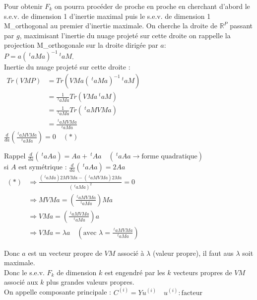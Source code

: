 \documentclass[a4paper, 12pt]{article}
\begin{document}
Pour obtenir $F_k$ on pourra procéder de proche en proche en cherchant d'abord le s.e.v. de dimension 1 d'inertie maximal puis le s.e.v. de dimension 1 M\_{}orthogonal au premier d'inertie maximale. On cherche la droite de $\mathbb{R}^P$ passant par $g$, maximisant l'inertie du nuage projeté sur cette droite on rappelle la projection M\_{}orthogonale sur la droite dirigée par $a$: \\
$P = a (\ ^t a Ma)^{-1} \ ^t a M$. \\

Inertie du nuage projeté sur cette droite : \\
$
\begin{aligned}
Tr(VMP) &= Tr(VM a (\ ^t a Ma)^{-1} \ ^t a M) \\
&= \frac{1}{\ ^t a Ma} Tr(VMa \ ^t aM) \\
&= \frac{1}{\ ^t a Ma} Tr(\ ^t a MVMa) \\
&= \frac{\ ^t a MVMa}{\ ^t a Ma}
\end{aligned}
$ \\

$\frac{d}{da} (\frac{\ ^t a MVMa}{\ ^t a Ma}) = 0 \quad (*)$ \\

\begin{rappel}{Rappel}
$\frac{d}{da} (\ ^t a Aa) = Aa + \ ^t A a \quad (\ ^t a Aa \rightarrow \text{forme quadratique})$ \\
si $A$ est symétrique : $\boxed{\frac{d}{da} (\ ^t a Aa) = 2 Aa}$ \\
$
\begin{aligned}
(*) &\Rightarrow \frac{(\ ^t a Ma) 2 MVMa - (\ ^t a MVMa) 2 Ma}{(\ ^t a Ma)^2} = 0 \\
&\Rightarrow MVMa = (\frac{\ ^t a MVMa}{\ ^t aMa}) Ma \\
&\Rightarrow VMa = (\frac{\ ^t a MVMa}{\ ^t a Ma}) a \\
&\Rightarrow \boxed{VMa = \lambda a} \quad (\text{avec } \lambda = \frac{\ ^t a MVMa}{\ ^t a Ma})
\end{aligned}
$ \\
\end{rappel}

Donc $a$ est un vecteur propre de $VM$ associé à $\lambda$ (valeur propre), il faut aus $\lambda$ soit maximale.\\
Donc le s.e.v. $F_k$ de dimension $k$ est engendré par les $k$ vecteurs propres de $VM$ associé aux $k$ plus grandes valeurs propres. \\
On appelle composante principale : $\boxed{C^{(i)} = Yu^{(i)}} \quad u^{(i)} : \text{facteur}$ \\
\end{document}
